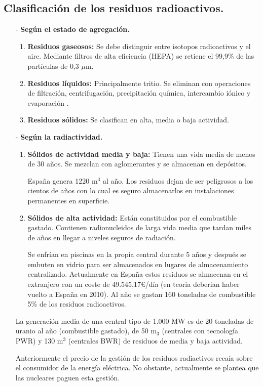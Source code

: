 \subsection{Clasificación de los residuos radioactivos.}
\begin{itemize}
	\item [-] \textbf{Según el estado de agregación.}
	\begin{enumerate}
		\item \textbf{Residuos gaseosos:} Se debe distinguir entre isotopos radioactivos y el aire. Mediante filtros de alta eficiencia (HEPA) se retiene el 99,9\% de las partículas de 0,3 $\mu$m.
		\item \textbf{Residuos líquidos:} Principalmente tritio. Se eliminan con operaciones de filtración, centrifugación, precipitación química,
		intercambio iónico y evaporación .
		\item \textbf{Residuos sólidos:} Se clasifican en alta, media o baja actividad.
	\end{enumerate}
	\item [-] \textbf{Según la radiactividad.}
	\begin{enumerate}
		\item \textbf{Sólidos de actividad media y baja:} Tienen una vida media de menos de 30 años. Se mezclan con aglomerantes y se almacenan en depósitos. 
		
		España genera 1220 m$^3$ al año. Los residuos dejan de ser peligrosos a los cientos de años con lo cual es seguro almacenarlos en instalaciones permanentes en superficie. 
		\item \textbf{Sólidos de alta actividad:} Están constituidos por el combustible gastado. Contienen radionucleidos de larga vida media que tardan miles de años en llegar a niveles seguros de radiación. 
		
		Se enfrían en piscinas en la propia central durante 5 años y después se embuten en vidrio para ser almacenados en lugares de almacenamiento centralizado. Actualmente en España estos residuos se almacenan en el extranjero con un coste de 49.545,17€/día (en teoria deberian haber vuelto a España en 2010). Al año se gastan 160 toneladas de combustible 5\% de los residuos radioactivos.
	\end{enumerate}
	La generación media de una central tipo de 1.000 MW es de 20 toneladas de uranio al
	año (combustible gastado), de 50 m$_3$ (centrales con tecnología PWR) y 130 m$^3$
	(centrales BWR) de residuos de media y baja actividad.
	
	Anteriormente el precio de la gestión de los residuos radiactivos recaía sobre el consumidor de la energía eléctrica. No obstante, actualmente se plantea que las nucleares paguen esta gestión.
\end{itemize}
